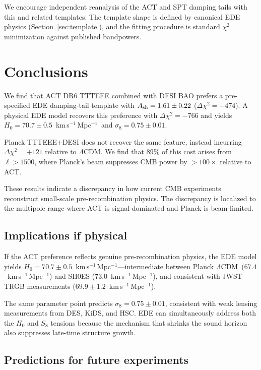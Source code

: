 \documentclass[twocolumn,showpacs,preprintnumbers,amsmath,amssymb,prd]{revtex4-2}
\newcommand{\lcdm}{$\Lambda$CDM}
\newcommand{\kms}{km\,s$^{-1}$\,Mpc$^{-1}$}
\begin{document}
We encourage independent reanalysis of the ACT and SPT damping tails 
with this and related templates. The template shape is defined by 
canonical EDE physics (Section~\ref{sec:template}), and the fitting 
procedure is standard $\chi^2$ minimization against published bandpowers.

\section{Conclusions}
\label{sec:conclusions}

We find that ACT DR6 TTTEEE combined with DESI BAO prefers a pre-specified 
EDE damping-tail template with $A_{\rm sh} = 1.61 \pm 0.22$ 
($\Delta\chi^2 = -474$). A physical EDE model recovers this preference 
with $\Delta\chi^2 = -766$ and yields $H_0 = 70.7 \pm 0.5$~\kms\ and 
$\sigma_8 = 0.75 \pm 0.01$.

Planck TTTEEE+DESI does not recover the same feature, instead incurring 
$\Delta\chi^2 = +121$ relative to \lcdm. We find that 89\% of this cost 
arises from $\ell > 1500$, where Planck's beam suppresses CMB power by 
$>100\times$ relative to ACT.

These results indicate a discrepancy in how current CMB experiments 
reconstruct small-scale pre-recombination physics. The discrepancy 
is localized to the multipole range where ACT is signal-dominated 
and Planck is beam-limited.

\subsection{Implications if physical}

If the ACT preference reflects genuine pre-recombination physics, 
the EDE model yields $H_0 = 70.7 \pm 0.5$~\kms---intermediate between 
Planck \lcdm\ ($67.4$~\kms) and SH0ES ($73.0$~\kms), and consistent 
with JWST TRGB measurements ($69.9 \pm 1.2$~\kms).

The same parameter point predicts $\sigma_8 = 0.75 \pm 0.01$, consistent 
with weak lensing measurements from DES, KiDS, and HSC. EDE can 
simultaneously address both the $H_0$ and $S_8$ tensions because 
the mechanism that shrinks the sound horizon also suppresses 
late-time structure growth.

\subsection{Predictions for future experiments}
\end{document}
